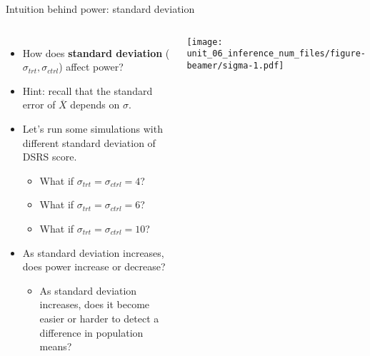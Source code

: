 \documentclass[
  ignorenonframetext,
  aspectratio=169]{beamer}
\newcommand{\columnsbegin}{\begin{columns}}
\newcommand{\columnsend}{\end{columns}}
\begin{document}
\begin{frame}{Intuition behind power: standard deviation}
\protect\hypertarget{intuition-behind-power-standard-deviation}{}
\columnsbegin


\footnotesize

\begin{itemize}
\item
  How does \textbf{standard deviation} (\(\sigma_{trt}, \sigma_{ctrl}\))
  affect power?
\item
  Hint: recall that the standard error of \(\overline{X}\) depends on
  \(\sigma\).
\item
  Let's run some simulations with different standard deviation of DSRS
  score.

  \begin{itemize}

    \footnotesize

    \item What if $\sigma_{trt} = \sigma_{ctrl} = 4$?

    \item What if $\sigma_{trt} = \sigma_{ctrl} = 6$?

    \item What if $\sigma_{trt} = \sigma_{ctrl} = 10$?

    \end{itemize}
\item
  As standard deviation increases, does power increase or decrease?

  \begin{itemize}

    \footnotesize

    \item As standard deviation increases, does it become easier or harder to detect a difference in population means?

    \end{itemize}
\end{itemize}


\texttt{[image: unit\_06\_inference\_num\_files/figure-beamer/sigma-1.pdf]}

\columnsend
\end{frame}
\end{document}
